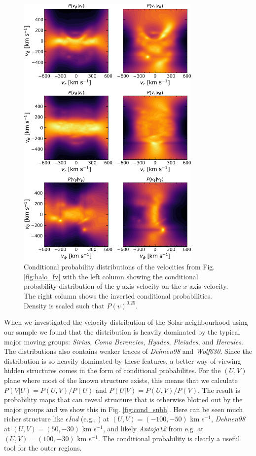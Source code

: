 \begin{figure}[t!]
    \centering
    \includegraphics[width=0.8\textwidth]{images/conditional_halo.pdf}
    \caption{Conditional probability distributions of the velocities from Fig. \ref{fig:halo_fv} with the left column showing the conditional probability distribution of the $y$-axis velocity on the $x$-axis velocity. The right column shows the inverted conditional probabilities. Density is scaled such that $P(v)^{0.25}$.} %
    \label{fig:cond_halo}
\end{figure}
When we investigated the velocity distribution of the Solar neighbourhood using our sample we found that the distribution is heavily dominated by the typical major moving groups: \textit{Sirius}, \textit{Coma Berencies}, \textit{Hyades}, \textit{Pleiades}, and \textit{Hercules}. The distributions also contains weaker traces of \textit{Dehnen98} and \textit{Wolf630}. Since the distribution is so heavily dominated by these features, a better way of viewing hidden structures comes in the form of conditional probabilites. For the $(U, V)$ plane where most of the known structure exists, this means that we calculate $P(V|U) = P(U,V) / P(U)$ and $P(U|V) = P(U,V) / P(V)$. The result is probability maps that can reveal structure that is otherwise blotted out by the major groups and we show this in Fig. \ref{fig:cond_snbh}. Here can be seen much richer structure like $\epsilon$\textit{Ind} (e.g., \citealt{antoja:12, kushniruk:17, bobylev:16}) at $(U, V) = (-100, -50)$ km s$^{-1}$, \textit{Dehnen98} \citep{antoja:12} at $(U, V) = (50, -30)$ km s$^{-1}$, and likely \textit{Antoja12} from e.g. \cite{kushniruk:17} at $(U, V) = (100, -30)$ km s$^{-1}$. The conditional probability is clearly a useful tool for the outer regions.

